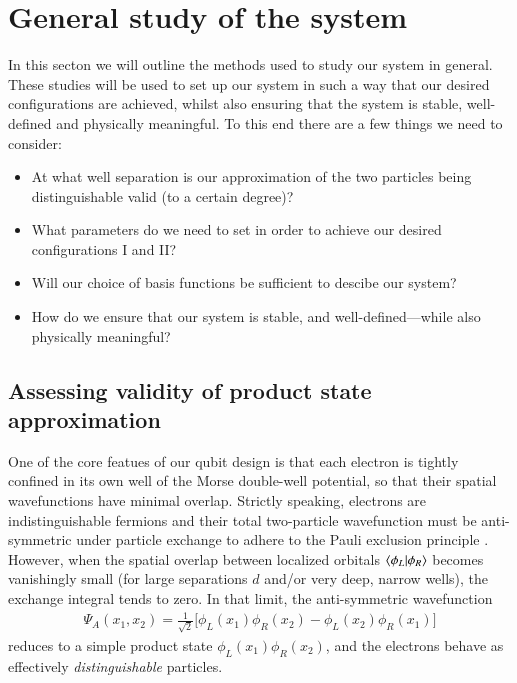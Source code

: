 \documentclass{subfiles}
\begin{document}
\section{General study of the system}
In this secton we will outline the methods used to study our system in general. These studies will be used to set up our system in such a way that our desired configurations are achieved, whilst also ensuring that the system is stable, well-defined and physically meaningful. To this end there are a few things we need to consider:
\begin{itemize}
    \item At what well separation is our approximation of the two particles being distinguishable valid (to a certain degree)?
    \item What parameters do we need to set in order to achieve our desired configurations I and II?
    \item Will our choice of basis functions be sufficient to descibe our system?
    \item How do we ensure that our system is stable, and well-defined—while also physically meaningful?
\end{itemize}
\subsection{Assessing validity of product state approximation}\label{sec:distinguishability} %
One of the core featues of our qubit design is that each electron is tightly confined in its own well of the Morse double-well potential, so that their spatial wavefunctions have minimal overlap. Strictly speaking, electrons are indistinguishable fermions and their total two-particle wavefunction must be anti-symmetric under particle exchange to adhere to the Pauli exclusion principle \cite{berera2021quantum, griffiths2018introduction}. However, when the spatial overlap between localized orbitals $\braket{\phi_L|\phi_R}$  becomes vanishingly small (for large separations $d$ and/or very deep, narrow wells), the exchange integral tends to zero. In that limit, the anti-symmetric wavefunction
\begin{align*}
    \Psi_A(x_1, x_2) = \frac{1}{\sqrt{2}} \bigg[\phi_L(x_1)\phi_R(x_2) - \phi_L(x_2)\phi_R(x_1)\bigg]
\end{align*}
reduces to a simple product state $\phi_L(x_1)\phi_R(x_2)$, and the electrons behave as effectively \emph{distinguishable} particles. 
\end{document}
